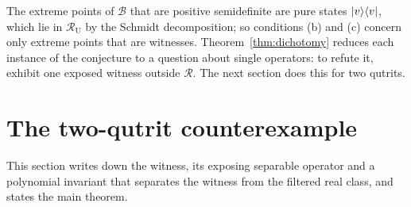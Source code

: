 \documentclass[11pt,a4paper]{article}
\theoremstyle{definition}\newtheorem{definition}[theorem]{Definition}\newtheorem*{conj}{Conjecture 9 of Shen, Chen and Bian}\newtheorem{remark}[theorem]{Remark}
\newcommand{\cB}{\mathcal B}\newcommand{\cR}{\mathcal R}\newcommand{\vecm}{\mathrm{vec}}
\begin{document}
The extreme points of $\cB$ that are positive semidefinite are pure states $\lvert v\rangle\langle v\rvert$, which lie in $\cR_{\mathrm U}$ by the Schmidt decomposition; so conditions (b) and (c) concern only extreme points that are witnesses. Theorem~\ref{thm:dichotomy} reduces each instance of the conjecture to a question about single operators: to refute it, exhibit one exposed witness outside $\cR$. The next section does this for two qutrits.

\section{The two-qutrit counterexample}\label{sec:example}
This section writes down the witness, its exposing separable operator and a polynomial invariant that separates the witness from the filtered real class, and states the main theorem.
\end{document}
